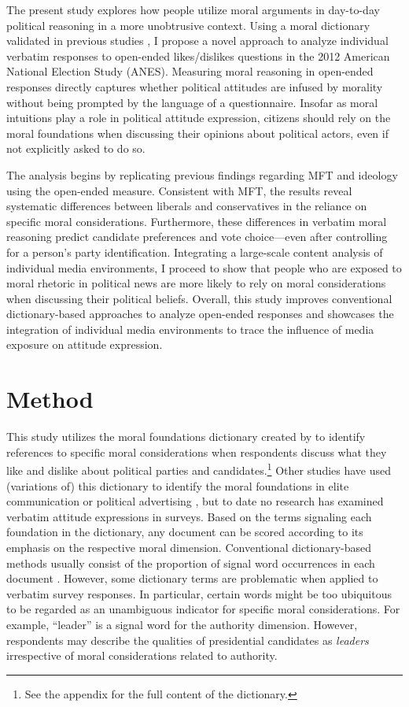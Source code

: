 \documentclass[12pt]{article}
\begin{document}
The present study explores how people utilize moral arguments in day-to-day political reasoning in a more unobtrusive context. Using a moral dictionary validated in previous studies \citep{graham2009liberals}, I propose a novel approach to analyze individual verbatim responses to open-ended likes/dislikes questions in the 2012 American National Election Study (ANES). Measuring moral reasoning in open-ended responses directly captures whether political attitudes are infused by morality without being prompted by the language of a questionnaire. Insofar as moral intuitions play a role in political attitude expression, citizens should rely on the moral foundations when discussing their opinions about political actors, even if not explicitly asked to do so.

The analysis begins by replicating previous findings regarding MFT and ideology using the open-ended measure. Consistent with MFT, the results reveal systematic differences between liberals and conservatives in the reliance on specific moral considerations. Furthermore, these differences in verbatim moral reasoning predict candidate preferences and vote choice---even after controlling for a person's party identification. Integrating a large-scale content analysis of individual media environments, I proceed to show that people who are exposed to moral rhetoric in political news are more likely to rely on moral considerations when discussing their political beliefs. Overall, this study improves conventional dictionary-based approaches to analyze open-ended responses and showcases the integration of individual media environments to trace the influence of media exposure on attitude expression.


\section*{Method}

This study utilizes the moral foundations dictionary created by \citet{graham2009liberals} to identify references to specific moral considerations when respondents discuss what they like and dislike about political parties and candidates.\footnote{See the appendix for the full content of the dictionary.} Other studies have used (variations of) this dictionary to identify the moral foundations in elite communication \citep[e.g.,][]{clifford2015concerns} or political advertising \citep[e.g.,][]{lipsitz2017playing}, but to date no research has examined verbatim attitude expressions in surveys. Based on the terms signaling each foundation in the dictionary, any document can be scored according to its emphasis on the respective moral dimension. Conventional dictionary-based methods usually consist of the proportion of signal word occurrences in each document \citep[e.g.,][]{graham2009liberals}. However, some dictionary terms are problematic when applied to verbatim survey responses. In particular, certain words might be too ubiquitous to be regarded as an unambiguous indicator for specific moral considerations. For example, ``leader'' is a signal word for the authority dimension. However, respondents may describe the qualities of presidential candidates as \textit{leaders} irrespective of moral considerations related to authority.
\end{document}
